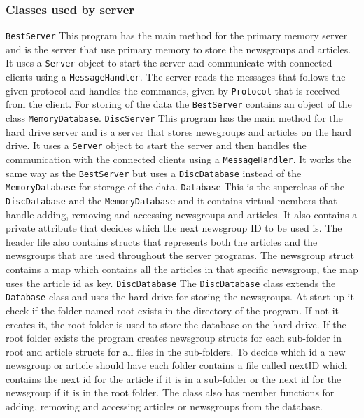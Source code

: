 \documentclass[a4paper]{article}
\def\code#1{\texttt{#1}}
\begin{document}
\subsubsection{Classes used by server}
\code{BestServer}\newline
This program has the main method for the primary memory server and  is the server that use primary memory to store the newsgroups and articles. It uses a \code{Server} object to start the server and communicate with connected clients using a \code{MessageHandler}. The server reads the messages that follows the given protocol and handles the commands, given by \code{Protocol} that is received from the client. For storing of the data the \code{BestServer} contains an object of the class \code{MemoryDatabase}.
\newline \newline
\code{DiscServer}\newline
This program has the main method for the hard drive server and is a server that stores newsgroups and articles on the hard drive. It uses a \code{Server} object to start the server and then handles the communication with the connected clients using a \code{MessageHandler}. It works the same way as the \code{BestServer} but uses a \code{DiscDatabase} instead of the \code{MemoryDatabase} for storage of the data. 
\newline \newline
\code{Database}\newline
This is the superclass of the \code{DiscDatabase} and the \code{MemoryDatabase} and it contains virtual members that handle adding, removing and accessing newsgroups and articles. It also contains a private attribute that decides which the next newsgroup ID to be used is. The header file also contains structs that represents both the articles and the newsgroups that are used throughout the server programs. The newsgroup struct contains a map which contains all the articles in that specific newsgroup, the map uses the article id as key.
\newline \newline
\code{DiscDatabase}\newline
The \code{DiscDatabase} class extends the \code{Database} class and uses the hard drive for storing the newsgroups. At start-up it check if the folder named root exists in the directory of the program. If not it creates it, the root folder is used to store the database on the hard drive. If the root folder exists the program creates newsgroup structs for each sub-folder in root and article structs for all files in the sub-folders. To decide which id a new newsgroup or article should have each folder contains a file called nextID which contains the next id for the article if it is in a sub-folder or the next id for the newsgroup if it is in the root folder. The class also has member functions for adding, removing and accessing articles or newsgroups from the database.
\end{document}
